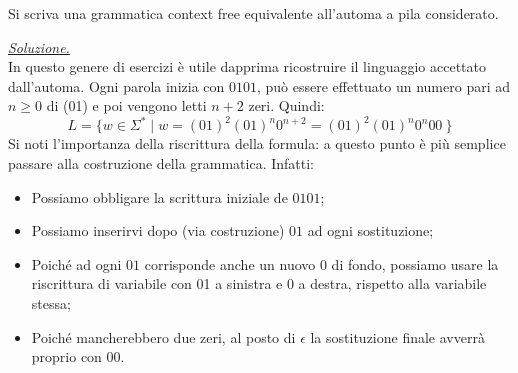 \documentclass[a4paper,10pt]{article}
\begin{document}
{\begin{itemize}[label=, leftmargin=0pt]
    {
  \small
    \begin{center}
    \end{center}
    }

    Si scriva una grammatica context free equivalente all'automa a pila considerato.

    \begin{osservazioni}
    
    \underline{\textit{Soluzione.}} \\
    In questo genere di esercizi è utile dapprima ricostruire il linguaggio accettato dall'automa. Ogni parola inizia con $0101$, può essere effettuato un numero pari ad $n\geq0$ di (01) e poi vengono letti $n+2$ zeri. Quindi:
    $$L=\{ w\in\Sigma^*\mid w=(01)^2(01)^n0^{n+2}=(01)^2(01)^n0^{n}00\ \}$$
    Si noti l'importanza della riscrittura della formula: a questo punto è più semplice passare alla costruzione della grammatica. Infatti:
    \begin{itemize}
        \item Possiamo obbligare la scrittura iniziale de $0101$;
        \item Possiamo inserirvi dopo (via costruzione) $01$ ad ogni sostituzione;
        \item Poiché ad ogni $01$ corrisponde anche un nuovo $0$ di fondo, possiamo usare la riscrittura di variabile con 01 a sinistra e 0 a destra, rispetto alla variabile stessa;
        \item Poiché mancherebbero due zeri, al posto di $\epsilon$ la sostituzione finale avverrà proprio con $00$.
    \end{itemize}


\end{osservazioni}
\end{itemize}}
\end{document}
